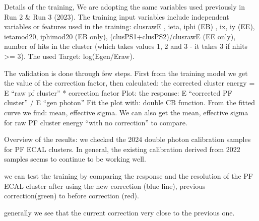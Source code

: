 Details of the training, We are adopting the same variables used previously in Run 2 & Run 3 (2023). The training input variables include independent variables or features used in the training:  
clusrawE , ieta, iphi (EB) , ix, iy (EE), ietamod20, iphimod20 (EB only), (clusPS1+clusPS2)/clusrawE (EE only), number of hits in the cluster (which takes values 1, 2 and 3 - it takes 3 if nhits >= 3). The used Target: log(Egen/Eraw).  

The validation is done through few steps. First from the training model we get the value of the correction factor, then calculated:  the corrected cluster energy = E “raw pf cluster” * correction factor Plot: the response: E “corrected PF cluster” / E “gen photon” Fit the plot with: double CB function. From the fitted curve we find: mean, effective sigma. We can also get the mean, effective sigma for raw PF cluster energy “with no correction” to compare. 

Overview of the results: we checked the 2024 double photon calibration samples for PF ECAL clusters. In general, the existing calibration derived from 2022 samples seems to continue to be working well. 

  


we can test the training by comparing the response and the resolution of the PF ECAL cluster after using the new correction (blue line), previous correction(green) to before correction (red).

generally we see that the current correction very close to the previous one.
